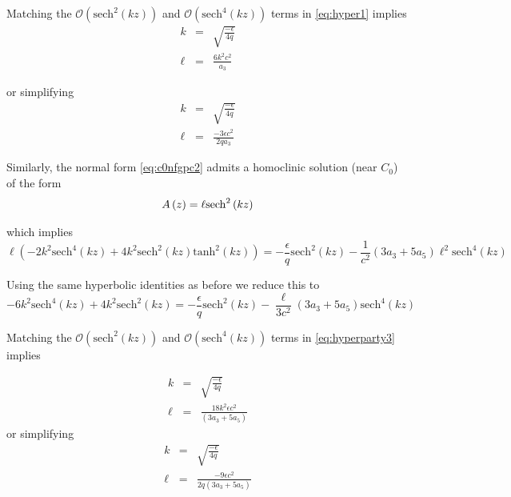 Matching the $\mathcal{O}\left(\mathrm{sech}^2\left(k z\right)\right)$  and   $\mathcal{O}\left(\mathrm{sech}^4\left(k z\right)\right)$ terms in \eqref{eq:hyper1} implies
\begin{subequations} 
\begin{eqnarray}
k &=& \sqrt{\frac{-\epsilon}{4q}}  \\
\ell &=& \frac{ 6 k^2 c^2 }{ a_3 } 
\end{eqnarray}
\end{subequations}

or simplifying
\begin{subequations} 
\begin{eqnarray}
k &=& \sqrt{\frac{-\epsilon}{4q}}  \\
\ell &=& \frac{ - 3 \epsilon c^2 }{2 q a_3 } 
\end{eqnarray}
\end{subequations}

Similarly, the normal form \eqref{eq:c0nfgpc2} admits a homoclinic solution (near $C_0$) of the form 
\begin{equation}\label{eq:solitongpc2}
A\left(z\right) = \ell \space \mathrm{sech}^2\left(k z\right)
\end{equation}

which implies
\begin{equation}\label{eq:hyperparty2}
\ell \left( -2 k^2 \mathrm{sech}^4(k z) + 4 k^2 \mathrm{sech}^2\left(kz\right) \mathrm{tanh}^2\left(kz\right) \right) = - \frac{\epsilon}{q} \mathrm{sech}^2(kz) - \frac{1}{c^2}\left(3a_3 + 5a_5\right) \ell^2 \mathrm{sech}^4(kz) 
\end{equation}

Using the same hyperbolic identities as before we reduce this to
\begin{equation}\label{eq:hyperparty3}
-6 k^2 \mathrm{sech}^4\left(k z\right) + 4 k^2 \mathrm{sech}^2\left(k z\right)=
-\frac{\epsilon}{q} \mathrm{sech}^2\left(k z\right) - \frac{\ell}{3c^2}\left(3a_3 + 5a_5\right) \mathrm{sech}^4\left( k z\right)
\end{equation}

Matching the $\mathcal{O}\left(\mathrm{sech}^2\left(k z\right)\right)$  and   $\mathcal{O}\left(\mathrm{sech}^4\left(k z\right)\right)$ terms in \eqref{eq:hyperparty3} implies

\begin{subequations} 
\begin{eqnarray}
k &=& \sqrt{\frac{-\epsilon}{4q}} \label{eq:keq} \\
\ell &=& \frac{ 18 k^2 \epsilon c^2 }{ \left(3 a_3 + 5 a_5\right) } 
\end{eqnarray}
\end{subequations}
or simplifying
\begin{subequations} 
\begin{eqnarray}
k &=& \sqrt{\frac{-\epsilon}{4q}} \label{eq:keq} \\
\ell &=& \frac{ - 9 \epsilon c^2 }{2 q \left(3 a_3 + 5 a_5\right) } 
\end{eqnarray}
\end{subequations}


